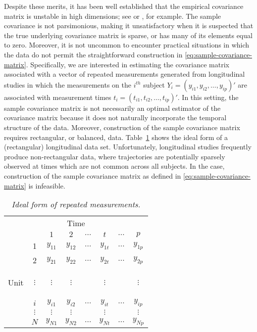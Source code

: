 Despite these merits, it has been well established that the empirical covariance matrix is unstable in high dimensions; see \cite{lin1985monte} or \cite{johnstone2001distribution}, for example. The sample covariance is not parsimonious, making it unsatisfactory when it is suspected that the true underlying covariance matrix is sparse, or has many of its elements equal to zero. Moreover, it is not uncommon to encounter practical situations in which the data do not permit the straightforward construction in \eqref{eq:sample-covariance-matrix}. Specifically, we are interested in estimating the covariance matrix associated with a vector of repeated measurements generated from longitudinal studies in which the measurements on the $i^{th}$ subject $Y_i = \left(y_{i1}, y_{i2}, \dots, y_{ip}\right)'$ are associated with measurement times $t_i = \left(t_{i1}, t_{i2}, \dots, t_{ip}\right)'$. In this setting, the sample covariance matrix is not necessarily an optimal estimator of the covariance matrix because it does not naturally incorporate the temporal structure of the data. Moreover, construction of the sample covariance matrix requires rectangular, or balanced, data. Table~\ref{table:ideal-repeated-measurements} shows the ideal form of a (rectangular) longitudinal data set. Unfortunately, longitudinal studies frequently produce non-rectangular data, where trajectories are potentially sparsely observed at times which are not common across all subjects. In the case, construction of the sample covariance matrix as defined in \eqref{eq:sample-covariance-matrix} is infeasible. 

\bigskip

\begin{table}[H] 
\centering
\caption{\textit{Ideal form of repeated measurements.}}
\begin{tabular}{cc|cccccc}
\multicolumn{8}{c}{Time}\\
& & $1$&$2$ &  $\dots$ & $t$ & $\dots$ & $p$ \\ \midrule
& 1 & $y_{11}$&$y_{12}$ &$\dots$ & $y_{1t}$ & $\dots$& $y_{1p}$ \\
& 2 & $y_{21}$&$y_{22}$ &$\dots$ & $y_{2t}$ & $\dots$& $y_{2p}$ \\
\begin{rotate}{90}%
\mbox{Unit}\end{rotate} & $\vdots$ &$\vdots$&$\vdots$ & &$\vdots$ & & $\vdots$ \\
& $i$ & $y_{i1}$&$y_{i2}$ &$\dots$ & $y_{it}$ & $\dots$& $y_{ip}$ \\
 & $\vdots$ &$\vdots$&$\vdots$ & &$\vdots$ & & $\vdots$ \\
 & $N$ & $y_{N1}$&$y_{N2}$ &$\dots$ & $y_{Nt}$ & $\dots$& $y_{Np}$ \\
\end{tabular} \label{table:ideal-repeated-measurements}
\end{table}

